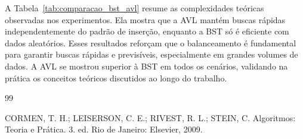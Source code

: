 \documentclass[12pt,a4paper]{article}
\begin{document}
A Tabela~\ref{tab:comparacao_bst_avl} resume as complexidades teóricas observadas nos experimentos. Ela mostra que a AVL mantém buscas rápidas independentemente do padrão de inserção, enquanto a BST só é eficiente com dados aleatórios. Esses resultados reforçam que o balanceamento é fundamental para garantir buscas rápidas e previsíveis, especialmente em grandes volumes de dados. A AVL se mostrou superior à BST em todos os cenários, validando na prática os conceitos teóricos discutidos ao longo do trabalho.

\newpage

\begin{thebibliography}{99}

CORMEN, T. H.; LEISERSON, C. E.; RIVEST, R. L.; STEIN, C. 
Algoritmos: Teoria e Prática. 3. ed. Rio de Janeiro: Elsevier, 2009. 

\end{thebibliography}
\end{document}
